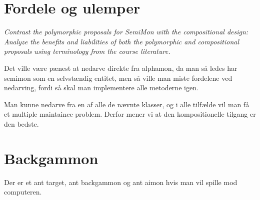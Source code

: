 \documentclass[a4paper]{article}
\begin{document}
\section{Fordele og ulemper}
\textit{Contrast the polymorphic proposals for SemiMon with the
  compositional design: Analyze the benefits and liabilities of both
  the polymorphic and compositional proposals using terminology from
  the course literature.}


Det ville være pænest at nedarve direkte fra alphamon, da man så
ledes har semimon som en selvstændig entitet, men så ville man miste
fordelene ved nedarving, fordi så skal man implementere alle metoderne
igen.

Man kunne nedarve fra en af alle de nævnte klasser, og i alle tilfælde
vil man få et multiple maintaince problem. Derfor mener vi at den
kompositionelle tilgang er den bedste. 

\section{Backgammon}

Der er et ant target, ant backgammon og ant aimon hvis man vil spille
mod computeren.
\end{document}
